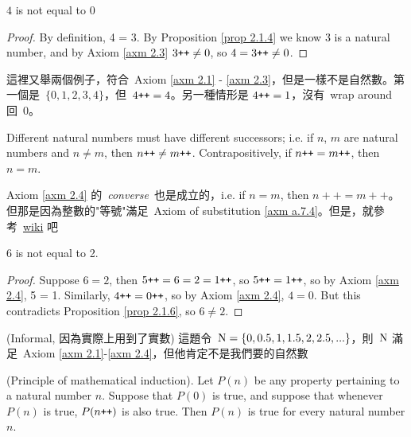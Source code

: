 \begin{proposition}\label{prop 2.1.6}
\(4\) is not equal to \(0\)
\end{proposition}
\begin{proof}
By definition, 4 = 3\INC. By Proposition \ref{prop 2.1.4} we know 3 is a natural number, and by Axiom \ref{axm 2.3} \(3\texttt{++} \neq 0\), so \(4 = 3\texttt{++} \neq 0\).
\end{proof}

\begin{example}\label{example 2.1.7}
這裡又舉兩個例子，符合\ Axiom \ref{axm 2.1} - \ref{axm 2.3}，但是一樣不是自然數。第一個是\ \(\{0,1,2,3,4\}\)，但\ \(4\texttt{++} = 4\)。另一種情形是 \(4\texttt{++} = 1\)，沒有\ wrap around 回\ 0。
\end{example}

\begin{axiom}\label{axm 2.4}
Different natural numbers must have different successors; i.e. if \(n\), \(m\) are natural numbers and \(n \neq m\), then \(n\texttt{++} \neq m\texttt{++}\). Contrapositively, if \(n\texttt{++} = m\texttt{++}\), then \(n = m\).
\end{axiom}

\begin{note}
Axiom \ref{axm 2.4} 的\ \emph{converse}\ 也是成立的，i.e. if \(n = m\), then \(n++ = m++\)。但那是因為整數的"等號"滿足\ Axiom of substitution \ref{axm a.7.4}。但是，就參考\ \href{https://www.wikiwand.com/en/Peano_axioms#/Formulation}{wiki} 吧
\end{note}

\begin{proposition}\label{prop 2.1.8}
6 is not equal to 2.
\end{proposition}
\begin{proof}
Suppose \( 6 = 2 \), then \( 5\texttt{++} = 6 = 2 = 1\texttt{++} \), so \(5\texttt{++} = 1\texttt{++} \), so by Axiom \ref{axm 2.4}, 5 = 1. Similarly, \(4\texttt{++} = 0\texttt{++}\), so by Axiom \ref{axm 2.4}, \(4 = 0\). But this contradicts Proposition \ref{prop 2.1.6}, so \(6 \neq 2\).
\end{proof}

\begin{example}\label{example 2.1.9}(Informal, 因為實際上用到了實數)
這題令\ \( \textup{N} = \{0, 0.5, 1, 1.5, 2, 2.5, ...\}\)，則\ \(\textup{N}\) 滿足\ Axiom \ref{axm 2.1}-\ref{axm 2.4}，但他肯定不是我們要的自然數
\end{example}

\begin{axiom}\label{axm 2.5} (Principle of mathematical induction). Let \(P(n)\) be any property pertaining to a natural number \(n\). Suppose that \(P(0)\) is true, and suppose that whenever \(P(n)\) is true, \(P(n\texttt{++})\) is also true. Then \(P(n)\) is true for every natural number \(n\).
\end{axiom}

